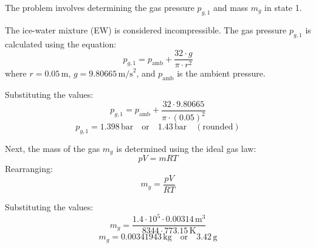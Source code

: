 The problem involves determining the gas pressure \( p_{g,1} \) and mass \( m_g \) in state 1.  

The ice-water mixture (EW) is considered incompressible. The gas pressure \( p_{g,1} \) is calculated using the equation:  
\[
p_{g,1} = p_{\text{amb}} + \frac{32 \cdot g}{\pi \cdot r^2}
\]  
where \( r = 0.05 \, \text{m} \), \( g = 9.80665 \, \text{m/s}^2 \), and \( p_{\text{amb}} \) is the ambient pressure.  

Substituting the values:  
\[
p_{g,1} = p_{\text{amb}} + \frac{32 \cdot 9.80665}{\pi \cdot (0.05)^2}
\]  
\[
p_{g,1} = 1.398 \, \text{bar} \quad \text{or} \quad 1.43 \, \text{bar} \quad (\text{rounded})
\]  

Next, the mass of the gas \( m_g \) is determined using the ideal gas law:  
\[
p V = m R T
\]  
Rearranging:  
\[
m_g = \frac{p V}{R T}
\]  

Substituting the values:  
\[
m_g = \frac{1.4 \cdot 10^5 \cdot 0.00314 \, \text{m}^3}{8344 \cdot 773.15 \, \text{K}}
\]  
\[
m_g = 0.00341943 \, \text{kg} \quad \text{or} \quad 3.42 \, \text{g}
\]